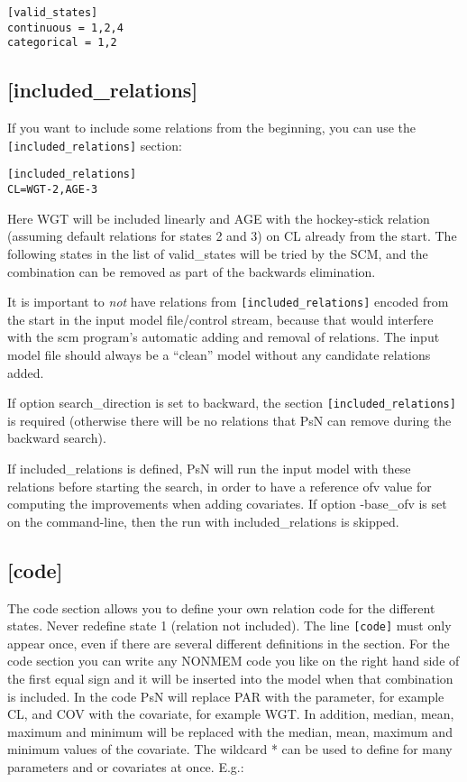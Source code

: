 \begin{verbatim}
[valid_states]
continuous = 1,2,4
categorical = 1,2
\end{verbatim}

\subsection{[included\_relations]}
If you want to include some relations from the beginning, you can use the 
\verb|[included_relations]| 
section:

\begin{verbatim}
[included_relations]
CL=WGT-2,AGE-3
\end{verbatim}

Here WGT will be included linearly and AGE with the hockey-stick relation (assuming default relations for states 2 and 3) on CL already from the start. The following states in the list of valid\_states will be tried by the SCM, and the combination can be removed as part of the backwards elimination. 

It is important to \emph{not} have relations from 
\verb|[included_relations]| 
encoded from the start in the input model file/control stream, because that would interfere with the scm program's automatic adding and removal of relations. The input model file should always be a ``clean'' model without any candidate relations added.

If option search\_direction is set to backward, the section 
\verb|[included_relations]|
is required (otherwise there will be no relations that PsN can remove during the backward search).

If included\_relations is defined, PsN will run the input model with these relations before starting the search, in order to have a reference ofv value for computing the improvements when adding covariates. If option -base\_ofv is set on the command-line, then the run with included\_relations is skipped. 

\subsection{[code]}
The code section allows you to define your own relation code for the different states. Never redefine state 1 (relation not included). The line \verb|[code]| must only appear once, even if there are several different definitions in the section. For the code section you can write any NONMEM code you like on the right hand side of the first equal sign and it will be inserted into the model when that combination is included. In the code PsN will replace PAR with the parameter, for example CL, and COV with the covariate, for example WGT. In addition, median, mean, maximum and minimum will be replaced with the median, mean, maximum and minimum values of the covariate. The wildcard * can be used to define for many parameters and or covariates at once. E.g.:

